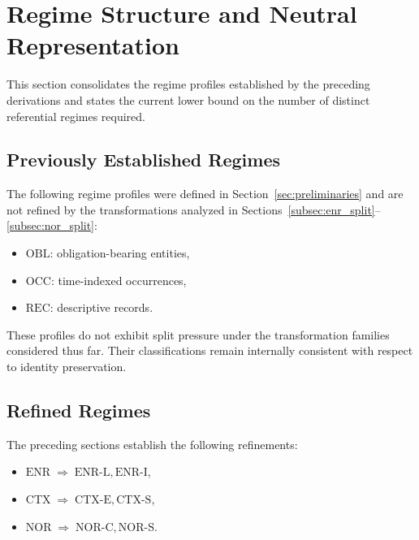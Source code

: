 
\section{Regime Structure and Neutral Representation}
\label{sec:representation}

This section consolidates the regime profiles established by the preceding
derivations and states the current lower bound on the number of distinct
referential regimes required.

\subsection{Previously Established Regimes}

The following regime profiles were defined in
Section~\ref{sec:preliminaries} and are not refined by the transformations
analyzed in Sections~\ref{subsec:enr_split}--\ref{subsec:nor_split}:

\begin{itemize}
\item $\mathrm{OBL}$: obligation-bearing entities,
\item $\mathrm{OCC}$: time-indexed occurrences,
\item $\mathrm{REC}$: descriptive records.
\end{itemize}


These profiles do not exhibit split pressure under the transformation
families considered thus far. Their classifications remain internally
consistent with respect to identity preservation.


\subsection{Refined Regimes}

The preceding sections establish the following refinements:

\begin{itemize}
\item $\mathrm{ENR} \;\Rightarrow\; \mathrm{ENR\mbox{-}L}, \mathrm{ENR\mbox{-}I}$,
\item $\mathrm{CTX} \;\Rightarrow\; \mathrm{CTX\mbox{-}E}, \mathrm{CTX\mbox{-}S}$,
\item $\mathrm{NOR} \;\Rightarrow\; \mathrm{NOR\mbox{-}C}, \mathrm{NOR\mbox{-}S}$.
\end{itemize}

